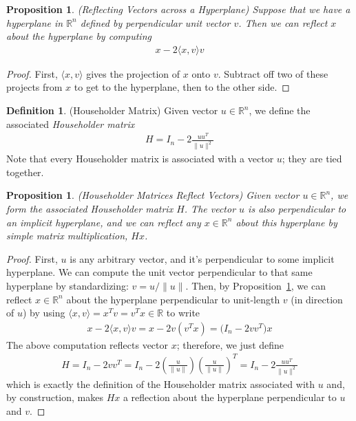 \documentclass[12pt]{book}
\numberwithin{equation}{section} %
\theoremstyle{plain}
\newtheorem{prop}[thm]{Proposition}
\theoremstyle{definition}
\newtheorem{defn}[thm]{Definition}
\theoremstyle{remark}
\newcommand{\R}{\mathbb{R}}
\newcommand{\Rn}{\mathbb{R}^n}
\begin{document}
\begin{prop}\emph{(Reflecting Vectors across a Hyperplane)}
\label{prop:reflect}
Suppose that we have a hyperplane in $\Rn$ defined by perpendicular
unit vector $v$. Then we can reflect $x$ about the hyperplane by
computing
\begin{align*}
  x - 2\langle x,v\rangle v
\end{align*}
\end{prop}
\begin{proof}
First, $\langle x,v\rangle$ gives the projection of $x$ onto $v$.
Subtract off two of these projects from $x$ to get to the hyperplane,
then to the other side.
\end{proof}

\begin{defn}(Householder Matrix)
Given vector $u\in\R^n$, we define the associated
\emph{Householder matrix}
\begin{align*}
  H = I_n - 2\frac{uu^T}{\lVert u\rVert^2}
\end{align*}
Note that every Householder matrix is associated with a vector $u$; they
are tied together.
\end{defn}

\begin{prop}\emph{(Householder Matrices Reflect Vectors)}
Given vector $u\in\Rn$, we form the associated Householder matrix $H$.
The vector $u$ is also perpendicular to an implicit hyperplane, and
we can reflect any $x\in\Rn$ about this hyperplane by simple matrix
multiplication, $Hx$.
\end{prop}
\begin{proof}
First, $u$ is any arbitrary vector, and it's perpendicular to some
implicit hyperplane. We can compute the unit vector perpendicular to
that same hyperplane by standardizing: $v=u/\lVert u\rVert$.
Then, by Proposition~\ref{prop:reflect}, we can reflect $x\in\Rn$ about
the hyperplane perpendicular to unit-length $v$ (in direction of $u$) by
using $\langle x,v\rangle=x^Tv=v^Tx\in\R$ to write
\begin{align*}
  x - 2\langle x,v\rangle v
  =
  x - 2 v(v^Tx)
  =
  \big( I_n - 2 vv^T\big)x
\end{align*}
The above computation reflects vector $x$; therefore, we just define
\begin{align*}
  H
  = I_n - 2 vv^T
  = I_n
  - 2 \left(\frac{u}{\lVert u\rVert}\right)
  \left(\frac{u}{\lVert u\rVert}\right)^T
  = I_n - 2 \frac{uu^T}{\lVert u\rVert^2}
\end{align*}
which is exactly the definition of the Householder matrix associated
with $u$ and, by construction, makes $Hx$ a reflection about the
hyperplane perpendicular to $u$ and $v$.
\end{proof}
\end{document}
